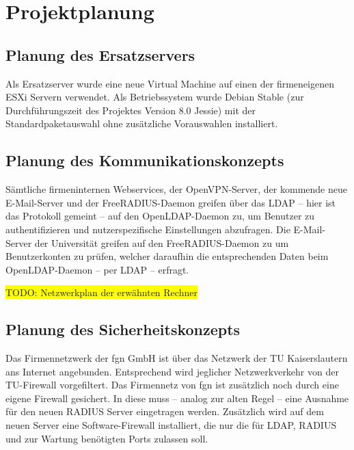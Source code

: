 \documentclass[11pt,a4paper,titlepage=firstiscover,headsepline,bibtotoc]{scrartcl} %
\newcommand{\hilight}[1]{\colorbox{yellow}{#1}} %
\begin{document}
\section{Projektplanung}
\subsection{Planung des Ersatzservers}
Als Ersatzserver wurde eine neue Virtual Machine auf einen der firmeneigenen ESXi Servern verwendet. Als Betriebssystem wurde Debian Stable (zur Durchführungszeit des Projektes Version 8.0 Jessie) mit der Standardpaketauswahl ohne zusätzliche Vorauswahlen installiert.

\subsection{Planung des Kommunikationskonzepts}
Sämtliche firmeninternen Webservices, der OpenVPN-Server, der kommende neue E-Mail-Server und der FreeRADIUS-Daemon greifen über das LDAP -- hier ist das Protokoll gemeint -- auf den OpenLDAP-Daemon zu, um Benutzer zu authentifizieren und nutzerspezifische Einstellungen abzufragen. Die E-Mail-Server der Universität greifen auf den FreeRADIUS-Daemon zu um Benutzerkonten zu prüfen, welcher daraufhin die entsprechenden Daten beim OpenLDAP-Daemon -- per LDAP -- erfragt.

\hilight{TODO: Netzwerkplan der erwähnten Rechner}

\subsection{Planung des Sicherheitskonzepts}\label{sec:Sicherheitskonzept}
Das Firmennetzwerk der fgn GmbH ist über das Netzwerk der TU Kaiserslautern ans Internet angebunden. Entsprechend wird jeglicher Netzwerkverkehr von der TU-Firewall vorgefiltert. Das Firmennetz von fgn ist zusätzlich noch durch eine eigene Firewall gesichert. In diese muss -- analog zur alten Regel -- eine Ausnahme für den neuen RADIUS Server eingetragen werden. Zusätzlich wird auf dem neuen Server eine Software-Firewall installiert, die nur die für LDAP, RADIUS und zur Wartung benötigten Ports zulassen soll.

\end{document}
